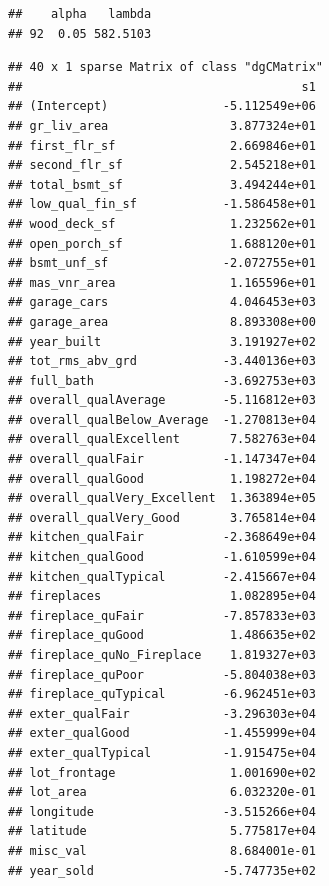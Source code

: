 \documentclass[
]{article}
\newenvironment{Shaded}{\begin{snugshade}}{\end{snugshade}}
\newcommand{\CommentTok}[1]{\textcolor[rgb]{0.56,0.35,0.01}{\textit{#1}}}
\newcommand{\FunctionTok}[1]{\textcolor[rgb]{0.00,0.00,0.00}{#1}}
\newcommand{\NormalTok}[1]{#1}
\newcommand{\SpecialCharTok}[1]{\textcolor[rgb]{0.00,0.00,0.00}{#1}}
\begin{document}
\begin{Shaded}
\end{Shaded}

\begin{verbatim}
##    alpha   lambda
## 92  0.05 582.5103
\end{verbatim}

\begin{Shaded}
\end{Shaded}

\begin{verbatim}
## 40 x 1 sparse Matrix of class "dgCMatrix"
##                                       s1
## (Intercept)                -5.112549e+06
## gr_liv_area                 3.877324e+01
## first_flr_sf                2.669846e+01
## second_flr_sf               2.545218e+01
## total_bsmt_sf               3.494244e+01
## low_qual_fin_sf            -1.586458e+01
## wood_deck_sf                1.232562e+01
## open_porch_sf               1.688120e+01
## bsmt_unf_sf                -2.072755e+01
## mas_vnr_area                1.165596e+01
## garage_cars                 4.046453e+03
## garage_area                 8.893308e+00
## year_built                  3.191927e+02
## tot_rms_abv_grd            -3.440136e+03
## full_bath                  -3.692753e+03
## overall_qualAverage        -5.116812e+03
## overall_qualBelow_Average  -1.270813e+04
## overall_qualExcellent       7.582763e+04
## overall_qualFair           -1.147347e+04
## overall_qualGood            1.198272e+04
## overall_qualVery_Excellent  1.363894e+05
## overall_qualVery_Good       3.765814e+04
## kitchen_qualFair           -2.368649e+04
## kitchen_qualGood           -1.610599e+04
## kitchen_qualTypical        -2.415667e+04
## fireplaces                  1.082895e+04
## fireplace_quFair           -7.857833e+03
## fireplace_quGood            1.486635e+02
## fireplace_quNo_Fireplace    1.819327e+03
## fireplace_quPoor           -5.804038e+03
## fireplace_quTypical        -6.962451e+03
## exter_qualFair             -3.296303e+04
## exter_qualGood             -1.455999e+04
## exter_qualTypical          -1.915475e+04
## lot_frontage                1.001690e+02
## lot_area                    6.032320e-01
## longitude                  -3.515266e+04
## latitude                    5.775817e+04
## misc_val                    8.684001e-01
## year_sold                  -5.747735e+02
\end{verbatim}
\end{document}

